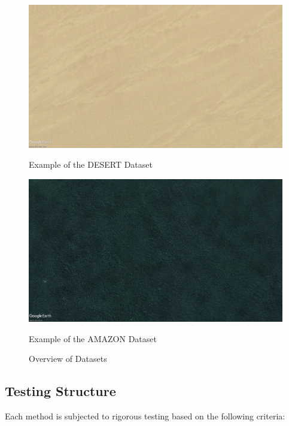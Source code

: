 \begin{figure}[H]
    \begin{minipage}{0.45\textwidth}
        \centering
        \includegraphics[width=\textwidth]{./Chapter 4/DEMODATASETS/DESERT1.jpg}
        \caption{Example of the DESERT Dataset}
        \label{fig:DESERT}
    \end{minipage}\hfill
    \begin{minipage}{0.45\textwidth}
        \centering
        \includegraphics[width=\textwidth]{./Chapter 4/DEMODATASETS/AMAZON.jpg}
        \caption{Example of the AMAZON Dataset}
        \label{fig:AMAZON}
    \end{minipage}
    
    \caption{Overview of Datasets}
    \label{fig:Datasets}
\end{figure}



\subsection{Testing Structure}

Each method is subjected to rigorous testing based on the following criteria:

